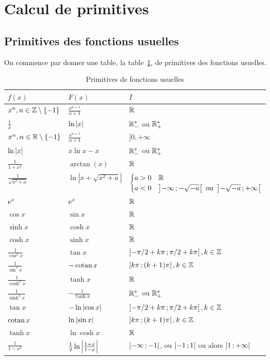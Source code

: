 \section{Calcul de primitives}

\subsection{Primitives des fonctions usuelles}

On commence par donner une table, la table~\ref{tab:primitivesusuelles}, de primitives des fonctions usuelles.

\begin{table}[!h]
  \centering
  \begin{tabular}{|l|l|l|} \hline
    $f(x)$ & $F(x)$ & $I$ \\ \hline
    $x^n, n \in\mathbb{Z}\setminus\{-1\}$& $\frac{x^{n+1}}{n+1}$ & $\mathbb{R}$ \\
    $\frac{1}{x}$ & $\ln\left\lvert x\right\rvert$ & $\mathbb{R}^*_-$ ou $\mathbb{R}^*_+$ \\
    $x^\alpha, \alpha \in\mathbb{R}\setminus\{-1\}$& $\frac{x^{\alpha+1}}{\alpha+1}$ & $]0,+\infty$ \\
    $\ln\left\lvert x\right\rvert$ & $x\ln{x}-x$ & $\mathbb{R}^*_-$ ou $\mathbb{R}^*_+$ \\
    $\frac{1}{1+x^2}$ & $\arctan(x)$ & $\mathbb{R}$ \\
    $\frac{1}{\sqrt{x^2+a}}$ & $\ln|x+\sqrt{x^2+a}|$ & $\begin{cases}a>0 & \mathbb{R} \\ a<0 & \left] -\infty \, ;  -\sqrt{-a} \right[ \text{~ou~}  \left] -\sqrt{-a} \, ;  +\infty \right[ \end{cases}$ \\
    $\operatorname{e}^x$ & $\operatorname{e}^x$ & $\mathbb{R}$ \\
    $\cos x$ & $\sin x$ & $\mathbb{R}$ \\
    $\sinh x$ & $\cosh x$ & $\mathbb{R}$ \\
    $\cosh x$ & $\sinh x$ & $\mathbb{R}$ \\
    $\frac{1}{\cos^2 x}$ & $\tan x$ & $\left] -\pi/2+k\pi \, ;  \pi/2+k\pi \right[, k \in \mathbb{Z}$ \\
    $\frac{1}{\sin^2 x}$ & $-\operatorname{cotan} x$ & $\left] k\pi \, ;  (k+1)\pi \right[, k \in \mathbb{Z}$ \\
    $\frac{1}{\cosh^2 x}$ & $\tanh x$ & $\mathbb{R}$ \\
    $\frac{1}{\sinh^2 x}$ & $-\frac{1}{\tanh x}$ & $\mathbb{R}^*_-$ ou $\mathbb{R}^*_+$ \\
    $\tan x$ & $-\ln\left\lvert\cos x\right\rvert$ & $\left] -\pi/2+k\pi \, ;  \pi/2+k\pi \right[, k \in \mathbb{Z}$ \\
    $\operatorname{cotan} x$& $\ln\left\lvert\sin x\right\rvert$ & $\left] k\pi \, ;  (k+1)\pi \right[, k \in \mathbb{Z}$ \\
    $\tanh x$& $\ln\cosh x$ & $\mathbb{R}$\\
    $\frac{1}{1-x^2}$ & $\frac{1}{2} \ln\left\lvert\frac{1+x}{1-x}\right\rvert$ & $\left] -\infty \, ;  -1 \right[$, ou $\left] -1 \, ;  1 \right[$ ou alors $\left] 1 \, ;  +\infty \right[$\\
  \hline\end{tabular}
  \caption{Primitives de fonctions usuelles}
  \label{tab:primitivesusuelles}
\end{table}

